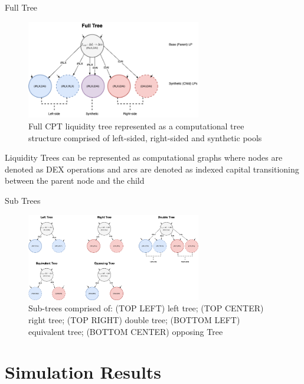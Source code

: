 \documentclass[10pt,xcolor=svgnames]{beamer} %
\begin{document}
\begin{frame}{Full Tree} 

\begin{figure}[h!]
\includegraphics[width=3in]{img/full_tree.png}
\caption{Full CPT liquidity tree represented as a computational tree structure comprised of left-sided, right-sided and synthetic pools } 
\label{fig:full_tree}
\end{figure}

Liquidity Trees can be represented as computational graphs where nodes are denoted as DEX operations and arcs are denoted as indexed capital transitioning between the parent node and the child

\end{frame}

\begin{frame}{Sub Trees} 

\begin{figure}[h!]
\includegraphics[width=3in]{img/sub_trees.png}
\caption{Sub-trees comprised of: (TOP LEFT) left tree; (TOP CENTER) right tree; (TOP RIGHT) double tree; (BOTTOM LEFT) equivalent tree; (BOTTOM CENTER) opposing Tree} 
\label{fig:sub_trees}
\end{figure}

\end{frame}


\section{Simulation Results}
\end{document}
